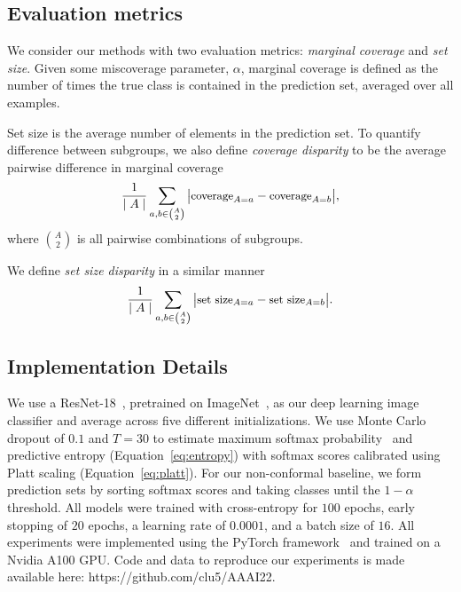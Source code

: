 \documentclass[letterpaper]{article} %
\begin{document}
    \subsection{Evaluation metrics}
        We consider our methods with two evaluation metrics: \textit{marginal coverage} and \textit{set size}.
        Given some miscoverage parameter, $\alpha$, marginal coverage is defined as the number of times the true class is contained in the prediction set, averaged over all examples.

        Set size is the average number of elements in the prediction set.
        To quantify difference between subgroups, we also define \textit{coverage disparity} to be the average pairwise difference in marginal coverage
        \begin{equation} \label{eq:cov-disparity}
        \small
        \frac{1}{\mid A \mid} \sum_{a, b \in \binom{A}{2}} \big\lvert \text{coverage}_{A=a} - \text{coverage}_{A=b} \big\rvert,
        \end{equation}
        where $\binom{A}{2}$ is all pairwise combinations of subgroups.

        We define \textit{set size disparity} in a similar manner
        \begin{equation} \label{eq:card-disparity}
        \small
        \frac{1}{\mid A \mid} \sum_{a, b \in \binom{A}{2}} \big\lvert \text{set size}_{A=a} - \text{set size}_{A=b} \big\rvert.
        \end{equation}

    \subsection{Implementation Details}
        We use a ResNet-18~\cite{DBLP:journals/corr/XieGDTH16}, pretrained on ImageNet~\cite{imagenet_cvpr09}, as our deep learning image classifier and average across five different initializations.
        We use Monte Carlo dropout of $0.1$ and $T=30$ to estimate maximum softmax probability~\cite{hendrycks17baseline} and predictive entropy (Equation~\ref{eq:entropy}) with softmax scores calibrated using Platt scaling (Equation~\ref{eq:platt}).
        For our non-conformal baseline, we form prediction sets by sorting softmax scores and taking classes until the $1 - \alpha$ threshold.
        All models were trained with cross-entropy for $100$ epochs, early stopping of $20$ epochs, a learning rate of $0.0001$, and a batch size of $16$.
        All experiments were implemented using the PyTorch framework~\cite{NEURIPS2019_9015} and trained on a Nvidia A100 GPU.
        Code and data to reproduce our experiments is made available here: https://github.com/clu5/AAAI22.
\end{document}
